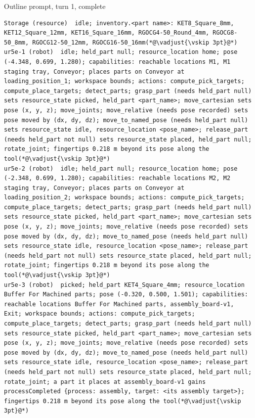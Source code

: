 \documentclass[preprint,12pt,authoryear]{elsarticle}
\begin{document}
\begin{fullbox}{Outline prompt, turn 1, complete}
\begin{lstlisting}[showlines=true]
Storage (resource)  idle; inventory.<part name>: KET8_Square_8mm, KET12_Square_12mm, KET16_Square_16mm, RGOCG4-50_Round_4mm, RGOCG8-50_8mm, RGOCG12-50_12mm, RGOCG16-50_16mm(*@\vadjust{\vskip 3pt}@*)
ur5e-1 (robot)  idle; held_part null; resource_location home; pose (-4.348, 0.699, 1.280); capabilities: reachable locations M1, M1 staging tray, Conveyor; places parts on Conveyor at loading_position_1; workspace bounds; actions: compute_pick_targets; compute_place_targets; detect_parts; grasp_part (needs held_part null) sets resource_state picked, held_part <part_name>; move_cartesian sets pose (x, y, z); move_joints; move_relative (needs pose recorded) sets pose moved by (dx, dy, dz); move_to_named_pose (needs held_part null) sets resource_state idle, resource_location <pose_name>; release_part (needs held_part not null) sets resource_state placed, held_part null; rotate_joint; fingertips 0.218 m beyond its pose along the tool(*@\vadjust{\vskip 3pt}@*)
ur5e-2 (robot)  idle; held_part null; resource_location home; pose (-2.348, 0.699, 1.280); capabilities: reachable locations M2, M2 staging tray, Conveyor; places parts on Conveyor at loading_position_2; workspace bounds; actions: compute_pick_targets; compute_place_targets; detect_parts; grasp_part (needs held_part null) sets resource_state picked, held_part <part_name>; move_cartesian sets pose (x, y, z); move_joints; move_relative (needs pose recorded) sets pose moved by (dx, dy, dz); move_to_named_pose (needs held_part null) sets resource_state idle, resource_location <pose_name>; release_part (needs held_part not null) sets resource_state placed, held_part null; rotate_joint; fingertips 0.218 m beyond its pose along the tool(*@\vadjust{\vskip 3pt}@*)
ur5e-3 (robot)  picked; held_part KET4_Square_4mm; resource_location Buffer For Machined parts; pose (-0.320, 0.500, 1.501); capabilities: reachable locations Buffer For Machined parts, assembly_board-v1, Exit; workspace bounds; actions: compute_pick_targets; compute_place_targets; detect_parts; grasp_part (needs held_part null) sets resource_state picked, held_part <part_name>; move_cartesian sets pose (x, y, z); move_joints; move_relative (needs pose recorded) sets pose moved by (dx, dy, dz); move_to_named_pose (needs held_part null) sets resource_state idle, resource_location <pose_name>; release_part (needs held_part not null) sets resource_state placed, held_part null; rotate_joint; a part it places at assembly_board-v1 gains processCompleted {process: assembly, target: <its assembly target>}; fingertips 0.218 m beyond its pose along the tool(*@\vadjust{\vskip 3pt}@*)

\end{lstlisting}
\end{fullbox}
\end{document}
